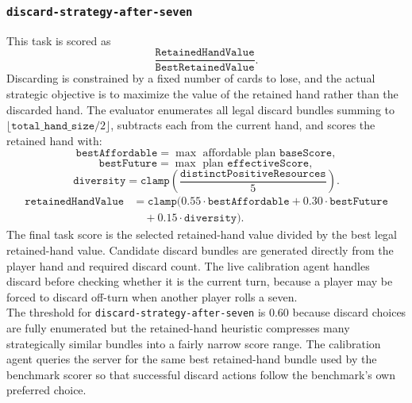 \documentclass{article}
\begin{document}
\subsubsection{\texttt{discard-strategy-after-seven}}
\label{app:task-discard-strategy-after-seven}
This task is scored as
\[
\frac{\texttt{RetainedHandValue}}{\texttt{BestRetainedValue}}.
\]
Discarding is constrained by a fixed number of cards to lose, and the actual strategic objective is to maximize the value of the retained hand rather than the discarded hand.
The evaluator enumerates all legal discard bundles summing to $\lfloor \texttt{total\_hand\_size} / 2 \rfloor$, subtracts each from the current hand, and scores the retained hand with:
\[
\texttt{bestAffordable} = \max \text{ affordable plan } \texttt{baseScore},
\]
\[
\texttt{bestFuture} = \max \text{ plan } \texttt{effectiveScore},
\]
\[
\texttt{diversity}
= \texttt{clamp}\left(\frac{\texttt{distinctPositiveResources}}{5}\right).
\]
\[
\begin{aligned}
\texttt{retainedHandValue}
&= \texttt{clamp}(
0.55 \cdot \texttt{bestAffordable}
+ 0.30 \cdot \texttt{bestFuture} \\
&\quad + 0.15 \cdot \texttt{diversity}).
\end{aligned}
\]
The final task score is the selected retained-hand value divided by the best legal retained-hand value.
Candidate discard bundles are generated directly from the player hand and required discard count. The live calibration agent handles discard before checking whether it is the current turn, because a player may be forced to discard off-turn when another player rolls a seven.
\\
The threshold for \texttt{discard-strategy-after-seven} is $0.60$ because discard choices are fully enumerated but the retained-hand heuristic compresses many strategically similar bundles into a fairly narrow score range. The calibration agent queries the server for the same best retained-hand bundle used by the benchmark scorer so that successful discard actions follow the benchmark's own preferred choice.
\end{document}
